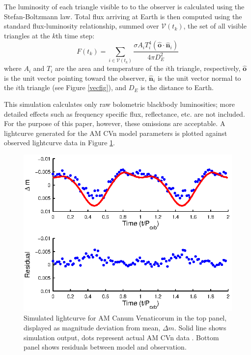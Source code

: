 \documentclass[preprint2]{aastex}
\begin{document}
The luminosity of each triangle visible to to the observer is
calculated using the Stefan-Boltzmann law. Total flux arriving at
Earth is then computed using the standard flux-luminosity
relationship, summed over $\mathcal{V}(t_k)$, the set of all visible
triangles at the $k$th time step:
\begin{equation}
   F(t_k) = \sum_{i \in \mathcal{V}(t_k)} \dfrac{\sigma A_i T_i^4
   (\hat{\textbf{o}} \cdot \hat{\textbf{n}}_i)}{4 \pi D_E^2}
\end{equation}
where $A_i$ and $T_i$ are the area and temperature of the $i$th
triangle, respectively, $\hat{\textbf{o}}$ is the unit vector
pointing toward the observer, $\hat{\textbf{n}}_i$ is the unit vector
normal to the $i$th triangle (see Figure \ref{vecfig}), and $D_E$ is
the distance to Earth.

This simulation calculates only raw bolometric blackbody
luminosities; more detailed effects such as frequency specific flux,
reflectance, etc. are not included. For the purpose of this paper,
however, these omissions are acceptable.  A lightcurve generated for 
the AM CVn model parameters is plotted against observed lightcurve 
data in Figure \ref{fig.LC_output}.

\begin{figure}[t]
  \centering
  \includegraphics[width=\columnwidth]{./amCvn_plus_residuals.eps}
  \caption{Simulated lightcurve for AM Canum Venaticorum in the top panel, displayed as
  magnitude deviation from mean, $\Delta m$. Solid line shows
  simulation output, dots represent actual AM CVn data
  \citep{1998ApJ...493L.105H}. Bottom panel shows residuals between model and observation.}
  \label{fig.LC_output}
\end{figure}
\end{document}
